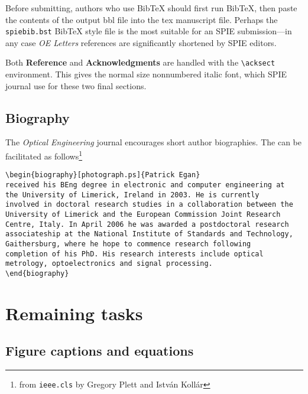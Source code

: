 \documentclass[10pt,letterpaper,optenglett,fleqn]{article}      %
\begin{document}
Before submitting, authors who use BibTeX should first run BibTeX,
then paste the contents of the output bbl file into the tex
manuscript file. Perhaps the \texttt{spiebib.bst} BibTeX style file
is the most suitable for an SPIE submission---in any case \emph{OE
Letters} references are significantly shortened by SPIE editors.

Both \textbf{Reference} and \textbf{Acknowledgments} are handled
with the \verb+\acksect+ environment. This gives the normal size
nonnumbered italic font, which SPIE journal use for these two final
sections.

\subsection{Biography}

The \emph{Optical Engineering} journal encourages short author
biographies. The can be facilitated as follows\footnote{from
\texttt{ieee.cls} by Gregory Plett and Istv\'{a}n Koll\'{a}r}

\scriptsize%
\begin{verbatim}
\begin{biography}[photograph.ps]{Patrick Egan}
received his BEng degree in electronic and computer engineering at
the University of Limerick, Ireland in 2003. He is currently
involved in doctoral research studies in a collaboration between the
University of Limerick and the European Commission Joint Research
Centre, Italy. In April 2006 he was awarded a postdoctoral research
associateship at the National Institute of Standards and Technology,
Gaithersburg, where he hope to commence research following
completion of his PhD. His research interests include optical
metrology, optoelectronics and signal processing.
\end{biography}
\end{verbatim}
\normalsize




\section{Remaining tasks}

\subsection{Figure captions and equations}
\end{document}

